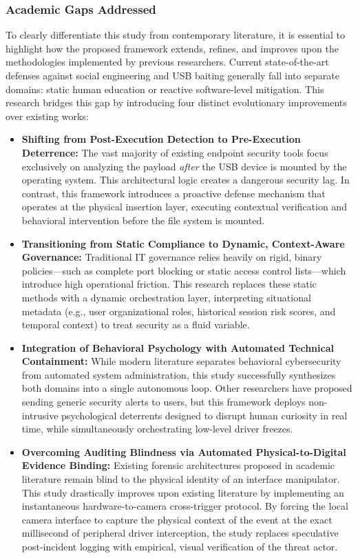 \documentclass{ieeeaccess}
\begin{document}
\subsubsection{Academic Gaps Addressed}
To clearly differentiate this study from contemporary literature, it is essential to highlight how the proposed framework extends, refines, and improves upon the methodologies implemented by previous researchers. Current state-of-the-art defenses against social engineering and USB baiting generally fall into separate domains: static human education or reactive software-level mitigation. This research bridges this gap by introducing four distinct evolutionary improvements over existing works:
\begin{itemize}
    \item \textbf{Shifting from Post-Execution Detection to Pre-Execution Deterrence:} The vast majority of existing endpoint security tools focus exclusively on analyzing the payload \textit{after} the USB device is mounted by the operating system. This architectural logic creates a dangerous security lag. In contrast, this framework introduces a proactive defense mechanism that operates at the physical insertion layer, executing contextual verification and behavioral intervention before the file system is mounted.
    \item \textbf{Transitioning from Static Compliance to Dynamic, Context-Aware Governance:} Traditional IT governance relies heavily on rigid, binary policies—such as complete port blocking or static access control lists—which introduce high operational friction. This research replaces these static methods with a dynamic orchestration layer, interpreting situational metadata (e.g., user organizational roles, historical session risk scores, and temporal context) to treat security as a fluid variable.
    \item \textbf{Integration of Behavioral Psychology with Automated Technical Containment:} While modern literature separates behavioral cybersecurity from automated system administration, this study successfully synthesizes both domains into a single autonomous loop. Other researchers have proposed sending generic security alerts to users, but this framework deploys non-intrusive psychological deterrents designed to disrupt human curiosity in real time, while simultaneously orchestrating low-level driver freezes.
    \item \textbf{Overcoming Auditing Blindness via Automated Physical-to-Digital Evidence Binding:} Existing forensic architectures proposed in academic literature remain blind to the physical identity of an interface manipulator. This study drastically improves upon existing literature by implementing an instantaneous hardware-to-camera cross-trigger protocol. By forcing the local camera interface to capture the physical context of the event at the exact millisecond of peripheral driver interception, the study replaces speculative post-incident logging with empirical, visual verification of the threat actor.
\end{itemize}
\end{document}
